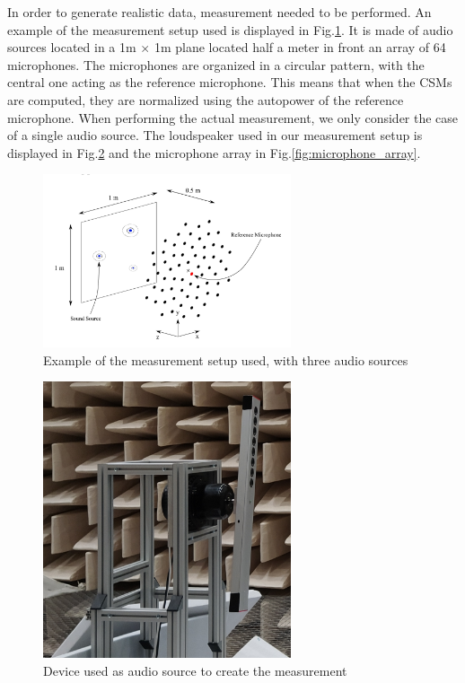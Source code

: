 \documentclass[11pt,a4paper,twoside]{report}
\begin{document}
In order to generate realistic data, measurement needed to be performed. An example of the measurement setup used is displayed in Fig.\ref{fig:full_measurement_setup}. It is made of audio sources located in a 1m $\times$ 1m plane located half a meter in front an array of 64 microphones. The microphones are organized in a circular pattern, with the central one acting as the reference microphone. This means that when the CSMs are computed, they are normalized using the autopower of the reference microphone. When performing the actual measurement, we only consider the case of a single audio source. The loudspeaker used in our measurement setup is displayed in Fig.\ref{fig:source} and the microphone array in Fig.\ref{fig:microphone_array}.


\begin{figure}
    \centering
    \includegraphics[width=0.65\textwidth]{figs/full_measurement_setup.png}
    \caption{Example of the measurement setup used, with three audio sources}
    \label{fig:full_measurement_setup}
\end{figure} 

\begin{figure}
    \centering
    \includegraphics[width=0.65\textwidth]{figs/source.png}
    \caption{Device used as audio source to create the measurement}
    \label{fig:source}
\end{figure}
\end{document}
